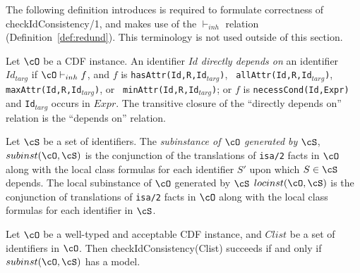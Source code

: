 The following definition introduces is required to formulate
correctness of {\sf checkIdConsistency/1}, and makes use of the
$\vdash_{inh}$ relation (Definition~\ref{def:redund}).  This
terminology is not used outside of this section.
\begin{definition}
 Let $\cO$ be a CDF instance.  An identifier $Id$ {\em directly
 depends on} an identifier $Id_{targ}$ if $\cO \vdash_{inh} f$, and
 $f$ is {\tt hasAttr(Id,R,Id$_{targ}$)}, {\tt
 allAttr(Id,R,Id$_{targ}$)}, {\tt maxAttr(Id,R,Id$_{targ}$)}, or {\tt
 minAttr(Id,R,Id$_{targ}$)}; or $f$ is {\tt necessCond(Id,Expr)} and
 {\tt Id$_{targ}$} occurs in $Expr$.  The transitive closure of the
 ``directly depends on'' relation is the ``depends on'' relation.

Let $\cS$ be a set of identifiers.  The {\em subinstance of $\cO$
generated by $\cS$}, $subinst(\cO,\cS)$ is the conjunction of the
translations of {\tt isa/2} facts in $\cO$ along with the local class
formulas for each identifier $S'$ upon which $S \in \cS$ depends.  The
local subinstance of $\cO$ generated by $\cS$ $locinst(\cO,\cS)$ is
the conjunction of translations of {\tt isa/2} facts in $\cO$ along
with the local class formulas for each identifier in $\cS$.
\end{definition}

\begin{theorem} \label{thm:type1consist}
Let $\cO$ be a well-typed and acceptable CDF instance, and $Clist$ be
a set of identifiers in $\cO$.  Then {\sf checkIdConsistency(Clist)}
succeeds if and only if $subinst(\cO,\cS)$ has a model.
\end{theorem}

